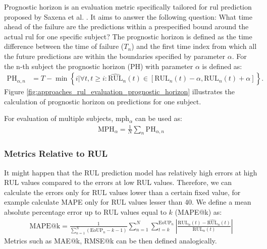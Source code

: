 Prognostic horizon is an evaluation metric specifically tailored for \acrshort{rul} prediction proposed by Saxena et al. \cite{saxena2010metrics}.
It aims to answer the following question: What time ahead of the failure are the predictions within a prespecified bound around the actual \acrshort{rul} for one specific subject?
The prognostic horizon is defined as the time difference between the time of failure ($T_n$) and the first time index from which all the future predictions are within the boundaries specified by parameter $\alpha$.
For the n-th subject the prognostic horizon (PH) with parameter $\alpha$ is defined as:
\begin{align*}
    \text{PH}_{\alpha, n} &= T - \min\left\{i|
        \forall t, t \geq i : \widehat{\text{RUL}}_n(t) \in [\text{RUL}_n(t) - \alpha, \text{RUL}_n(t) + \alpha]
  \right\}.
\end{align*}
Figure \ref{fig:approaches_rul_evaluation_prognostic_horizon} illustrates the calculation of prognostic horizon on predictions for one subject.

For evaluation of multiple subjects, \acrfull{mph}$_\alpha$ can be used as:
\begin{align*}
    \text{MPH}_\alpha = \frac{1}{N}\sum_{n}{\text{PH}_{\alpha, n}}
\end{align*}

\subsubsection{Metrics Relative to RUL}


It might happen that the RUL prediction model has relatively high errors at high RUL values compared to the errors at low RUL values.
Therefore, we can calculate the errors only for RUL values lower than a certain fixed value, for example calculate MAPE only for RUL values lesser than 40.
We define a mean absolute percentage error up to RUL values equal to $k$ (MAPE@k) as:
\begin{align*}
    \text{MAPE@k} = \frac{1}{\sum_{n=1}^N{{\left(\text{EoUP}_n - k - 1 \right)}}}\sum_{n=1}^{N}{\sum_{t=k}^{\text{EoUP}_n}\left|\frac{\text{RUL}_n(t) - \widehat{\text{RUL}}_n(t)}{\text{RUL}_n(t)}\right|}
\end{align*}
Metrics such as MAE@k, RMSE@k can be then defined analogically.

